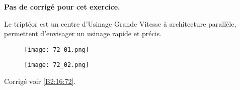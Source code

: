 \normaltrue \difficilefalse \tdifficilefalse
\correctionfalse

\exer{ $\star$ \label{B2:16:72}}
\setcounter{numques}{0}


\ifcorrection
\else
\textbf{Pas de corrigé pour cet exercice.}
\fi

Le triptéor est un centre d'Usinage Grande Vitesse à architecture parallèle, permettent d'envisager un usinage rapide et précis.


\begin{figure}[H]
\centering
\texttt{[image: 72\_01.png]}
\end{figure} 

\begin{figure}[H]
\centering
\texttt{[image: 72\_02.png]}
\end{figure} 



 

\ifprof
\else

\noindent\footnotesize
\normalsize

\begin{flushright}
\footnotesize{Corrigé  voir \ref{B2:16:72}.}
\end{flushright}%
\fi